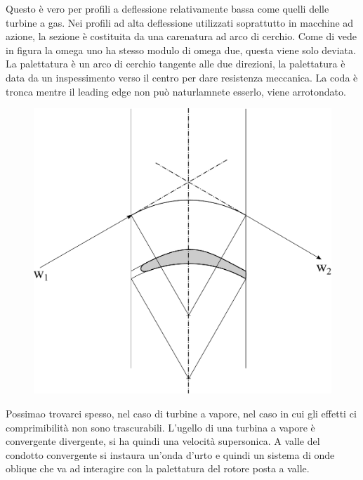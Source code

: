 Questo è vero per profili a deflessione relativamente bassa come quelli delle turbine a gas. Nei profili ad alta deflessione utilizzati soprattutto in macchine ad azione, la sezione è costituita da una carenatura ad arco di cerchio. Come di vede in figura la omega uno ha stesso modulo di omega due, questa viene solo deviata. La palettatura è un arco di cerchio tangente alle due direzioni, la palettatura è data da un inspessimento verso il centro per dare resistenza meccanica. La coda è tronca mentre il leading edge non può naturlamnete esserlo, viene arrotondato. 
\begin{figure}
\centering
  \includegraphics[width=.6\textwidth]{fig/palaBassaDef.pdf}
\caption{}
\label{fig:palaBassaDef}
\end{figure}
Possimao trovarci spesso, nel caso di turbine a vapore, nel caso in cui gli effetti ci comprimibilità non sono trascurabili. L'ugello di una turbina a vapore è convergente divergente, si ha quindi una velocità supersonica. A valle del condotto convergente si instaura un'onda d'urto e quindi un sistema di onde oblique che va ad interagire con la palettatura del rotore posta a valle.
